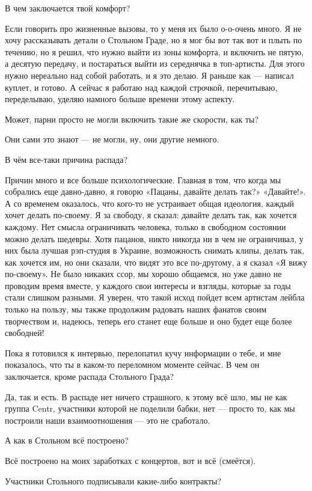 В чем заключается твой комфорт?

Если говорить про жизненные вызовы, то  у меня их было о-о-очень много. Я не
хочу рассказывать детали о Стольном Граде, но я мог бы вот так вот и плыть по
течению, но я решил, что нужно выйти из зоны комфорта, и включить не пятую, а
десятую передачу, и постараться выйти из середнячка в топ-артисты. Для этого
нужно нереально над собой работать, и я это делаю. Я раньше как --- написал
куплет, и готово. А сейчас я работаю над каждой строчкой, перечитываю,
переделываю, уделяю намного больше времени этому аспекту.

Может, парни просто не могли включить такие же скорости, как ты?

Они сами это знают --- не могли, ну, они другие немного.

В чём все-таки причина распада?

Причин много и все больше психологические. Главная в том, что когда мы
собрались еще давно-давно, я говорю «Пацаны, давайте делать так?» «Давайте!». А
со временем оказалось, что кого-то не устраивает общая идеология, каждый хочет
делать по-своему. Я за свободу, я сказал: давайте делать так, как хочется
каждому. Нет смысла ограничивать человека, только в свободном состоянии можно
делать шедевры. Хотя пацанов, никто никогда ни в чем не ограничивал, у них была
лучшая рэп-студия в Украине, возможность снимать клипы, делать так, как хочется
им, но они сказали, что видят это все по-другому, а я сказал «Я вижу
по-своему». Не было никаких ссор, мы хорошо общаемся, но уже давно не проводим
время вместе, у каждого свои интересы и взгляды, которые за годы стали слишком
разными. Я уверен, что такой исход пойдет всем артистам лейбла только на
пользу, мы также продолжим радовать наших фанатов своим творчеством и, надеюсь,
теперь его станет еще больше и оно будет еще более свободней!

Пока я готовился к интервью, перелопатил кучу информации о тебе, и мне
показалось, что ты в каком-то переломном моменте сейчас. В чем он заключается,
кроме распада Стольного Града?

Да, так и есть. В распаде нет ничего страшного, к этому всё шло, мы не как
группа Centr, участники которой не поделили бабки, нет --- просто то, как мы
построили наши взаимоотношения --- это не сработало.

А как в Стольном всё построено?

Всё построено на моих заработках с концертов, вот и всё (смеётся).

Участники Стольного подписывали какие-либо контракты?

